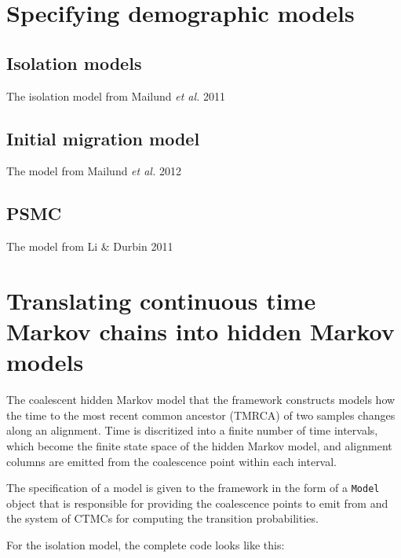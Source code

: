 \documentclass[11pt]{article}
\begin{document}
\section{Specifying demographic models}

\subsection{Isolation models}

The isolation model from Mailund \emph{et al.} 2011 \cite{Mailund:2011dv}

\subsection{Initial migration model}

The model from Mailund \emph{et al.} 2012 \cite{Mailund:2012ew}

\subsection{PSMC}

The model from Li \& Durbin 2011 \cite{Li:2011ez}


\section{Translating continuous time Markov chains into hidden Markov models}

The coalescent hidden Markov model that the framework constructs models how the time to the most recent common ancestor (TMRCA) of two samples changes along an alignment. Time is discritized into a finite number of time intervals, which become the finite state space of the hidden Markov model, and alignment columns are emitted from the coalescence point within each interval.

The specification of a model is given to the framework in the form of a \texttt{Model} object that is responsible for providing the coalescence points to emit from and the system of CTMCs for computing the transition probabilities.

For the isolation model, the complete code looks like this:
\end{document}

